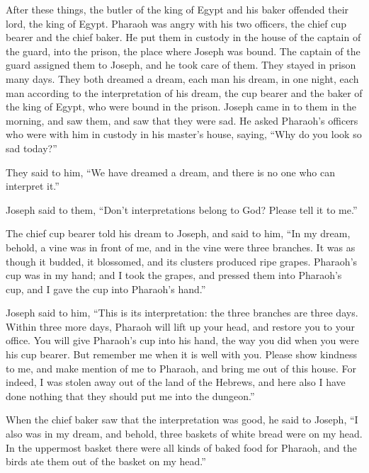 \mychapter{}
\myverse*{}After these things, the butler of the king of Egypt and his baker offended their lord, the king of Egypt.   \myverse{}Pharaoh was angry with his two officers, the chief cup bearer and the chief baker.   \myverse{}He put them in custody in the house of the captain of the guard, into the prison, the place where Joseph was bound.   \myverse{}The captain of the guard assigned them to Joseph, and he took care of them. They stayed in prison many days.   \myverse{}They both dreamed a dream, each man his dream, in one night, each man according to the interpretation of his dream, the cup bearer and the baker of the king of Egypt, who were bound in the prison.   \myverse{}Joseph came in to them in the morning, and saw them, and saw that they were sad.   \myverse{}He asked Pharaoh’s officers who were with him in custody in his master’s house, saying, “Why do you look so sad today?”

\myverse{}They said to him, “We have dreamed a dream, and there is no one who can interpret it.”

Joseph said to them, “Don’t interpretations belong to God? Please tell it to me.”

\myverse{}The chief cup bearer told his dream to Joseph, and said to him, “In my dream, behold, a vine was in front of me,   \myverse{}and in the vine were three branches. It was as though it budded, it blossomed, and its clusters produced ripe grapes.   \myverse{}Pharaoh’s cup was in my hand; and I took the grapes, and pressed them into Pharaoh’s cup, and I gave the cup into Pharaoh’s hand.”

\myverse{}Joseph said to him, “This is its interpretation: the three branches are three days.   \myverse{}Within three more days, Pharaoh will lift up your head, and restore you to your office. You will give Pharaoh’s cup into his hand, the way you did when you were his cup bearer.   \myverse{}But remember me when it is well with you. Please show kindness to me, and make mention of me to Pharaoh, and bring me out of this house.   \myverse{}For indeed, I was stolen away out of the land of the Hebrews, and here also I have done nothing that they should put me into the dungeon.”

\myverse{}When the chief baker saw that the interpretation was good, he said to Joseph, “I also was in my dream, and behold, three baskets of white bread were on my head.   \myverse{}In the uppermost basket there were all kinds of baked food for Pharaoh, and the birds ate them out of the basket on my head.”


